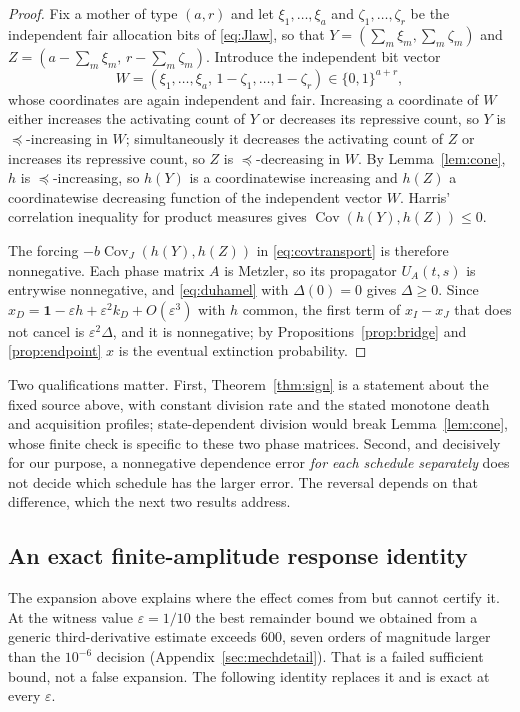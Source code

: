 \documentclass[11pt]{article}
\theoremstyle{remark}
\newcommand{\one}{\mathbf 1}
\newcommand{\eps}{\varepsilon}
\newcommand{\Cov}{\operatorname{Cov}}
\begin{document}
\begin{proof}
Fix a mother of type $(a,r)$ and let $\xi_1,\dots,\xi_a$ and
$\zeta_1,\dots,\zeta_r$ be the independent fair allocation bits of
\eqref{eq:Jlaw}, so that $Y=(\sum_m\xi_m,\sum_m\zeta_m)$ and
$Z=(a-\sum_m\xi_m,\,r-\sum_m\zeta_m)$. Introduce the independent bit vector
\[
 W=(\xi_1,\dots,\xi_a,\,1-\zeta_1,\dots,1-\zeta_r)\in\{0,1\}^{a+r},
\]
whose coordinates are again independent and fair. Increasing a coordinate of $W$
either increases the activating count of $Y$ or decreases its repressive count,
so $Y$ is $\preceq$-increasing in $W$; simultaneously it decreases the activating
count of $Z$ or increases its repressive count, so $Z$ is $\preceq$-decreasing in
$W$. By Lemma~\ref{lem:cone}, $h$ is $\preceq$-increasing, so $h(Y)$ is a
coordinatewise increasing and $h(Z)$ a coordinatewise decreasing function of the
independent vector $W$. Harris' correlation inequality for product measures
\cite{harris1960} gives $\Cov(h(Y),h(Z))\le0$.

The forcing $-b\Cov_J(h(Y),h(Z))$ in \eqref{eq:covtransport} is therefore
nonnegative. Each phase matrix $A$ is Metzler, so its propagator $U_A(t,s)$ is
entrywise nonnegative, and \eqref{eq:duhamel} with $\Delta(0)=0$ gives
$\Delta\ge0$. Since $x_D=\one-\eps h+\eps^2k_D+O(\eps^3)$ with $h$ common, the
first term of $x_I-x_J$ that does not cancel is $\eps^2\Delta$, and it is
nonnegative; by Propositions~\ref{prop:bridge} and \ref{prop:endpoint} $x$ is
the eventual extinction probability.
\end{proof}

Two qualifications matter. First, Theorem~\ref{thm:sign} is a statement about the
fixed source above, with constant division rate and the stated monotone death and
acquisition profiles; state-dependent division would break Lemma~\ref{lem:cone},
whose finite check is specific to these two phase matrices. Second, and
decisively for our purpose, a nonnegative dependence error \emph{for each
schedule separately} does not decide which schedule has the larger error. The
reversal depends on that difference, which the next two results address.

\subsection{An exact finite-amplitude response identity}
The expansion above explains where the effect comes from but cannot certify it.
At the witness value $\eps=1/10$ the best remainder bound we obtained from a
generic third-derivative estimate exceeds $600$, seven orders of magnitude larger
than the $10^{-6}$ decision (Appendix~\ref{sec:mechdetail}). That is a failed
sufficient bound, not a false expansion. The following identity replaces it and
is exact at every $\eps$.
\end{document}
